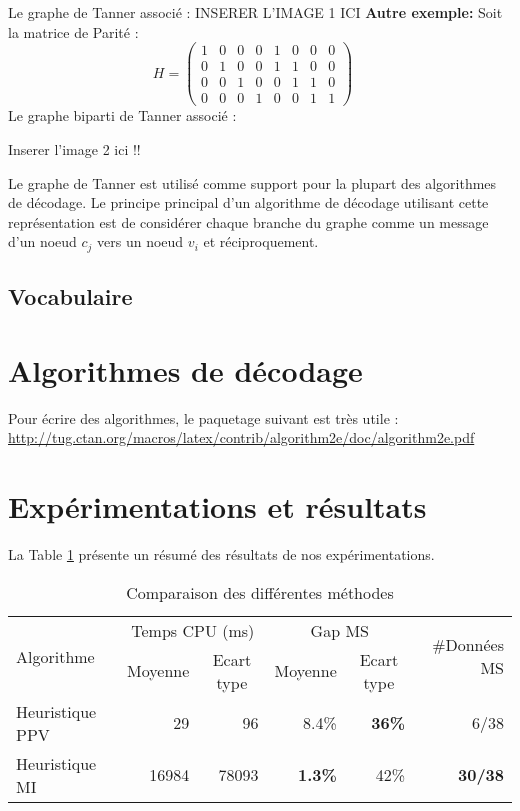 \documentclass[french,nochapter,11pt]{rapportUB}
\begin{document}
Le graphe de Tanner associé : \newline
INSERER L'IMAGE 1  ICI \newline
\textbf{Autre exemple:}
Soit la matrice de Parité : \newline
$$H=
\begin{pmatrix}
  1 & 0 & 0 & 0 & 1 & 0 & 0 & 0 \\
  0 & 1 & 0 & 0 & 1 & 1 & 0 & 0 \\
  
  0 & 0 & 1 & 0 & 0 & 1 & 1 & 0 \\
  0 & 0 & 0 & 1 & 0 & 0 & 1 & 1 
  
  
\end{pmatrix}
\quad
$$
Le graphe biparti de Tanner associé : \newline

Inserer l'image 2 ici !! \newline

Le graphe de Tanner est utilisé comme support pour la plupart des algorithmes de décodage. Le principe principal d'un algorithme de décodage utilisant cette représentation est de considérer chaque branche du graphe comme un message d'un noeud $c_j$ vers un noeud $v_i$ et réciproquement.


\subsection{Vocabulaire}



\section{Algorithmes de décodage}
\label{sec:algo}

Pour écrire des algorithmes, le paquetage suivant est très utile : \url{http://tug.ctan.org/macros/latex/contrib/algorithm2e/doc/algorithm2e.pdf}  


\section{Expérimentations et résultats}
\label{sec:exp}

La Table \ref{table:resultats} présente un résumé des résultats de nos expérimentations. 

\begin{table}[htbp]
  \centering
  \caption{Comparaison des différentes méthodes}
  \label{table:resultats}
    \begin{tabular}{l|rrrrr}
    \hline
    \multirow{2}[0]{*}{Algorithme}&  \multicolumn{2}{c}{Temps CPU (ms)}  & \multicolumn{2}{c}{Gap MS} &  \multirow{2}[0]{*}{\#Données MS}  \\
        & \multicolumn{1}{c}{Moyenne}   & \multicolumn{1}{c}{Ecart type} & \multicolumn{1}{c}{Moyenne} & \multicolumn{1}{c}{Ecart type} & \\
          \hline
    Heuristique PPV & 29 & 96 & 8.4\% & \textbf{36\%} &  6/38\\
    Heuristique MI & 16984 & 78093  & \textbf{1.3\%} & 42\% &   \textbf{30/38} \\
    \hline
    \end{tabular}%
\end{table}%
\end{document}
